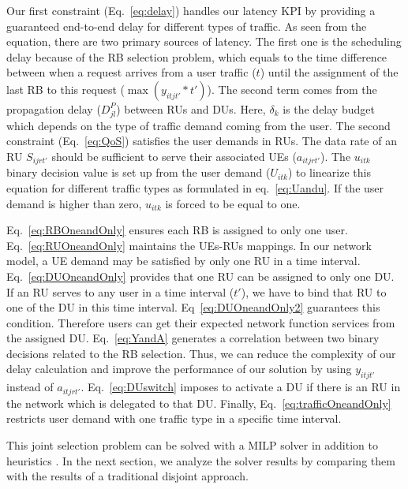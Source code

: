 \documentclass[conference]{IEEEtran}
\begin{document}
\par Our first constraint (Eq.~\ref{eq:delay}) handles our latency KPI by providing a guaranteed end-to-end delay for different types of traffic. As seen from the equation, there are two primary sources of latency. The first one is the scheduling delay because of the RB selection problem, which equals to the time difference between when a request arrives from a user traffic ($t$) until the assignment of the last RB to this request ($\max(y_{itjt'}*t')$). The second term comes from the propagation delay ($D_{jl}^{P}$) between RUs and DUs. Here, $\delta_{k}$ is the delay budget which depends on the type of traffic demand coming from the user. The second constraint (Eq.~\ref{eq:QoS}) satisfies the user demands in RUs. The data rate of an RU $S_{ijrt'}$ should be sufficient to serve their associated UEs ($a_{itjrt'}$). The $u_{itk}$ binary decision value is set up from the user demand ($U_{itk}$) to linearize this equation for different traffic types as formulated in eq.~\ref{eq:Uandu}. If the user demand is higher than zero, $u_{itk}$ is forced to be equal to one.
\par Eq.~\ref{eq:RBOneandOnly} ensures each RB is assigned to only one user.  Eq.~\ref{eq:RUOneandOnly} maintains the UEs-RUs mappings. In our network model, a UE demand may be satisfied by only one RU in a time interval. Eq.~\ref{eq:DUOneandOnly} provides that one RU can be assigned to only one DU. If an RU serves to any user in a time interval ($t'$), we have to bind that RU to one of the DU in this time interval. Eq~\ref{eq:DUOneandOnly2} guarantees this condition. Therefore users can get their expected network function services from the assigned DU. Eq.~\ref{eq:YandA} generates a correlation between two binary decisions related to the RB selection. Thus, we can reduce the complexity of our delay calculation and improve the performance of our solution by using $y_{itjt'}$ instead of $a_{itjrt'}$. Eq.~\ref{eq:DUswitch} imposes to activate a DU if there is an RU in the network which is delegated to that DU.  Finally, Eq.~\ref{eq:trafficOneandOnly} restricts user demand with one traffic type in a specific time interval.
\par This joint selection problem can be solved with a MILP solver in addition to heuristics \cite{Fendt2018}. In the next section, we analyze the solver results by comparing them with the results of a traditional disjoint approach.
\end{document}
